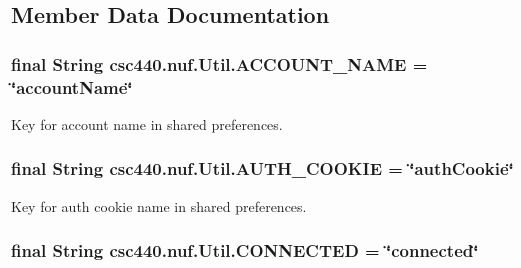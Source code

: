 \subsection{Member Data Documentation}
\hypertarget{classcsc440_1_1nuf_1_1_util_a40b66c29439ea7980ebe035fc1f33547}{
\subsubsection[{A\-C\-C\-O\-U\-N\-T\-\_\-\-N\-A\-M\-E}]{\setlength{\rightskip}{0pt plus 5cm}final String {\bf csc440.\-nuf.\-Util.\-A\-C\-C\-O\-U\-N\-T\-\_\-\-N\-A\-M\-E} = \char`\"{}account\-Name\char`\"{}}}\label{classcsc440_1_1nuf_1_1_util_a40b66c29439ea7980ebe035fc1f33547}
Key for account name in shared preferences. \hypertarget{classcsc440_1_1nuf_1_1_util_a5261d5e5a553256bbe76b2fbee31c909}{
\subsubsection[{A\-U\-T\-H\-\_\-\-C\-O\-O\-K\-I\-E}]{\setlength{\rightskip}{0pt plus 5cm}final String {\bf csc440.\-nuf.\-Util.\-A\-U\-T\-H\-\_\-\-C\-O\-O\-K\-I\-E} = \char`\"{}auth\-Cookie\char`\"{}}}\label{classcsc440_1_1nuf_1_1_util_a5261d5e5a553256bbe76b2fbee31c909}
Key for auth cookie name in shared preferences. \hypertarget{classcsc440_1_1nuf_1_1_util_a0f9fe311a7c4baf4d5a0f373839aaf6e}{
\subsubsection[{C\-O\-N\-N\-E\-C\-T\-E\-D}]{\setlength{\rightskip}{0pt plus 5cm}final String {\bf csc440.\-nuf.\-Util.\-C\-O\-N\-N\-E\-C\-T\-E\-D} = \char`\"{}connected\char`\"{}}}\label{classcsc440_1_1nuf_1_1_util_a0f9fe311a7c4baf4d5a0f373839aaf6e}
